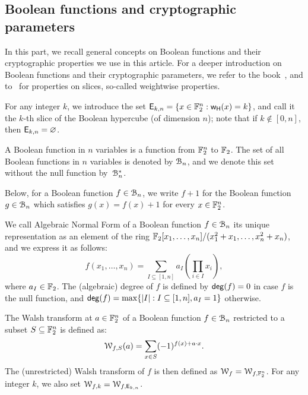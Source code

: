 \documentclass{llncs}
\begin{document}
\subsection{Boolean functions and cryptographic parameters}

In this part, we recall general concepts on Boolean functions and their cryptographic properties we use in this article. 
For a deeper introduction on Boolean functions and their cryptographic parameters, we refer to the book~\cite{Carlet20}, and to~\cite{TOSC:CarMeaRot17} for properties on slices, so-called weightwise properties.

\begin{definition}[Slice]
    For any integer $k$, we introduce the set $\mathsf{E}_{k,n}=\{x\in \mathbb{F}_2^n:\mathsf{w_H}(x)=k\}$, and call it the $k$-th slice of the Boolean hypercube (of dimension $n$); note that if $k\not\in[0,n]$, then $\mathsf{E}_{k,n}=\varnothing$.
\end{definition}

\begin{definition}\label{def:bool_f}
	A Boolean function in $n$ variables is a function from $\mathbb{F}_2^n$ to $\mathbb{F}_2$. The set of all Boolean functions in $n$ variables is denoted by $\mathcal{B}_n$, and we denote this set without the null function by~$\mathcal{B}_n^*$.
\end{definition}

Below, for a Boolean function $f\in\mathcal{B}_n$, we write $f+1$ for the Boolean function $g\in\mathcal{B}_n$ which satisfies $g(x)=f(x)+1$ for every $x\in\mathbb{F}_2^n$.

\begin{definition}\label{def:anf}
	We call Algebraic Normal Form of a Boolean function $f\in\mathcal{B}_n$ its unique representation as an element of the ring $\mathbb{F}_2[x_1,\dots,x_n]/(x_1^2+x_1,\dots,x_n^2+x_n)$, and we express it as follows:
	\[
		f(x_1,\dots,x_n)= \sum_{I \subseteq [1,n]} a_I \left( \prod_{i \in I} x_i \right),
	\]
	where $a_I\in \mathbb{F}_2$. The (algebraic) degree of $f$ is defined by $\mathsf{deg}(f)=0$ in case $f$ is the null function, and $\mathsf{deg}(f)=\max\{ |I|:I\subseteq[1,n],a_I=1\}$ otherwise.
\end{definition}

\begin{definition}\label{def:walsh_transform}
	The Walsh transform at $a \in \mathbb{F}_2^n$ of a Boolean function $f\in\mathcal{B}_n$ restricted to a subset $S\subseteq \mathbb{F}_2^n$ is defined as:
    \[  \mathcal W_{f,S} (a) = \sum_{x\in S} (-1)^{f(x)+a \cdot x}.\]
    The (unrestricted) Walsh transform of $f$ is then defined as $\mathcal W_{f}=\mathcal W_{f,\mathbb{F}_2^n}$. For any integer $k$, we also set $\mathcal W_{f,k}=\mathcal W_{f,\mathsf{E}_{k,n}}$.
\end{definition}
\end{document}
